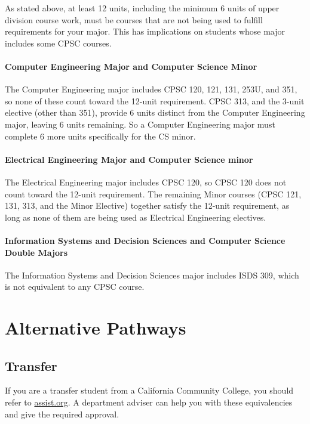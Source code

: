 \documentclass{book}
\begin{document}
As stated above, at least 12 units, including the minimum 6 units of
upper division course work, must be courses that are not being used to
fulfill requirements for your major. This has implications on students
whose major includes some CPSC courses.

\subsubsection{Computer Engineering Major and Computer Science Minor}

The Computer Engineering major includes CPSC 120, 121, 131, 253U, and
351, so none of these count toward the 12-unit requirement. CPSC 313,
and the 3-unit elective (other than 351), provide 6 units distinct
from the Computer Engineering major, leaving 6 units remaining. So a
Computer Engineering major must complete 6 more units specifically for
the CS minor.

\subsubsection{Electrical Engineering Major and Computer Science minor}

The Electrical Engineering major includes CPSC 120, so CPSC 120 does
not count toward the 12-unit requirement. The remaining Minor courses
(CPSC 121, 131, 313, and the Minor Elective) together satisfy the
12-unit requirement, as long as none of them are being used as
Electrical Engineering electives.

\subsubsection{Information Systems and Decision Sciences and Computer Science Double Majors}

The Information Systems and Decision Sciences major includes ISDS 309,
which is not equivalent to any CPSC course.
 
\chapter{Alternative Pathways}

\section{Transfer}

If you are a transfer student from a California Community College, you
should refer to \url{assist.org}. A department adviser can help you
with these equivalencies and give the required approval.
\end{document}

